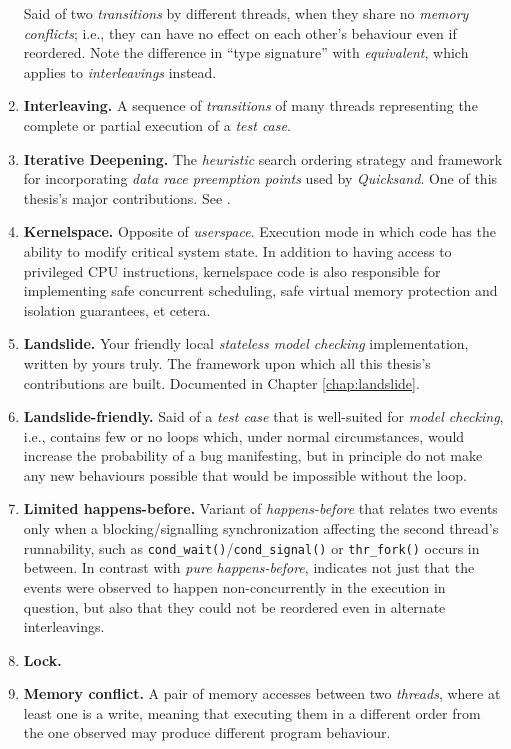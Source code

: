 \begin{enumerate}
		Said of two {\em transitions} by different threads,
		when they share no {\em memory conflicts};
		i.e., they can have no effect on each other's behaviour even if reordered.
		Note the difference in ``type signature'' with {\em equivalent}, which applies to {\em interleavings} instead.
	\item {\bf Interleaving.}
		A sequence of {\em transitions} of many threads representing the complete or partial execution
		of a {\em test case}.
	\item {\bf Iterative Deepening.}
		The {\em heuristic} search ordering strategy and framework for incorporating {\em data race preemption points}
		used by {\em Quicksand}.
		One of this thesis's major contributions.
		See \sect{\ref{sec:quicksand-id}}.
	\item {\bf Kernelspace.}
		Opposite of {\em userspace}.
		Execution mode in which code has the ability to modify critical system state.
		In addition to having access to privileged CPU instructions,
		kernelspace code is also responsible for implementing safe
		concurrent scheduling, safe virtual memory protection and isolation guarantees, et cetera.
	\item {\bf Landslide.}
		Your friendly local {\em stateless model checking} implementation, written by yours truly.
		The framework upon which all this thesis's contributions are built.
		Documented in Chapter \ref{chap:landslide}.
	\item {\bf Landslide-friendly.}
		Said of a {\em test case} that is well-suited for {\em model checking},
		i.e.,
		contains few or no loops which,
		under normal circumstances, would increase the probability of a bug manifesting,
		but in principle do not make any new behaviours possible that would be impossible without the loop.
	\item {\bf Limited happens-before.}
		Variant of {\em happens-before} that relates two events only when a blocking/signalling synchronization affecting
		the second thread's runnability, such as {\tt cond\_wait()}/{\tt cond\_signal()} or {\tt thr\_fork()}
		occurs in between.
		In contrast with {\em pure happens-before},
		indicates not just that the events were observed
		to happen non-concurrently in the execution in question,
		but also that they could not be reordered even in alternate interleavings.
	\item {\bf Lock.}
	\item {\bf Memory conflict.}
		A pair of memory accesses between two {\em threads}, where at least one is a write,
		meaning that executing them in a different order from the one observed may produce different program behaviour.

\end{enumerate}
